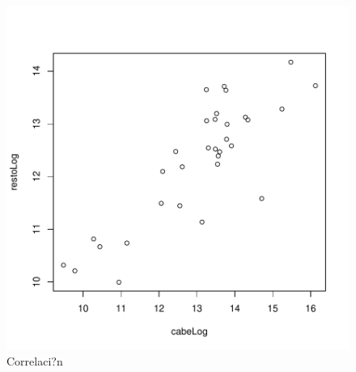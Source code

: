 \documentclass{article}
\begin{document}
\begin{figure}[h]
\centering
\begin{adjustbox}{}

\includegraphics{ProyectoFinal-CorrInd}
\end{adjustbox}
\caption{Correlaci?n}
\label{CorrInd}
\end{figure}


\end{document}
